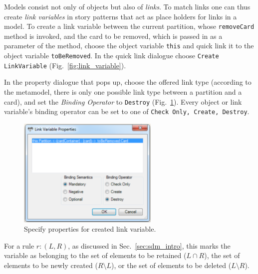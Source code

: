 Models consist not only of objects but also of \emph{links}.  
To match links one can thus create \emph{link variables} in story patterns that act as place 
holders for links in a model.  
To create a link variable between the current partition, whose \texttt{removeCard} method is invoked, and the card to be removed, which is passed in as a parameter of the method, choose the object variable \texttt{this} and quick link it to the object variable \texttt{toBeRemoved}.  
In the quick link dialogue choose \texttt{Create LinkVariable} (Fig.~\ref{fig:link_variable}).

In the property dialogue that pops up, choose the offered link type (according to the metamodel, there is only one possible link type between a partition and a 
card), and set the \emph{Binding Operator} to \texttt{Destroy} (Fig.~\ref{fig:link_variable_properties}). 
Every object or link variable's binding operator can be set to one of \texttt{Check Only, Create, Destroy}.

\begin{figure}[htp] 
\begin{center} 
 \includegraphics[width=0.6\textwidth]{pics/sdmBilder/removeCard/sdm12RAW}
  \caption{Specify properties for created link variable.}  
  \label{fig:link_variable_properties}
\end{center}
\end{figure}



For a rule $r: (L, R)$, as discussed in Sec.~\ref{sec:sdm_intro}, this marks the variable as belonging to the set of elements to be retained ($L\cap R$), the set of elements to be newly created ($R\setminus L$), or the set of elements to be deleted ($L\setminus R$).
 
